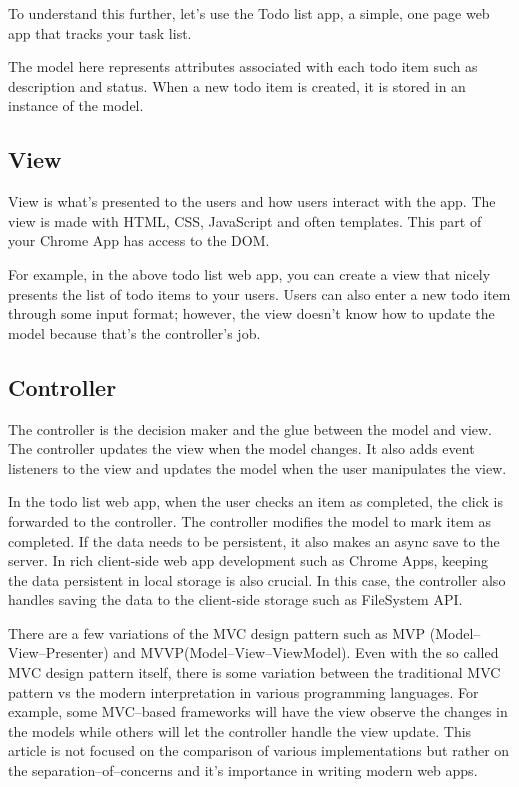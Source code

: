 To understand this further, let's use the Todo list app, a simple, one page web app that tracks your task list.


The model here represents attributes associated with each todo item such as description and status. When a new todo item is created, it is stored in an instance of the model.


\subsection{View}
View is what's presented to the users and how users interact with the app. The view is made with HTML, CSS, JavaScript and often templates. This part of your Chrome App has access to the DOM.

For example, in the above todo list web app, you can create a view that nicely presents the list of todo items to your users. Users can also enter a new todo item through some input format; however, the view doesn't know how to update the model because that's the controller's job.


\subsection{Controller}
The controller is the decision maker and the glue between the model and view. The controller updates the view when the model changes. It also adds event listeners to the view and updates the model when the user manipulates the view.

In the todo list web app, when the user checks an item as completed, the click is forwarded to the controller. The controller modifies the model to mark item as completed. If the data needs to be persistent, it also makes an async save to the server. In rich client-side web app development such as Chrome Apps, keeping the data persistent in local storage is also crucial. In this case, the controller also handles saving the data to the client-side storage such as FileSystem API.

There are a few variations of the MVC design pattern such as MVP (Model–View–Presenter) and MVVP(Model–View–ViewModel). Even with the so called MVC design pattern itself, there is some variation between the traditional MVC pattern vs the modern interpretation in various programming languages. For example, some MVC–based frameworks will have the view observe the changes in the models while others will let the controller handle the view update. This article is not focused on the comparison of various implementations but rather on the separation–of–concerns and it's importance in writing modern web apps.

